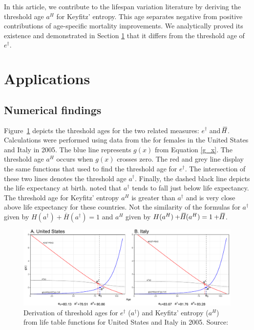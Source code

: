 \documentclass[a4paper,twoside, openright, 12pt, leqno]{article}
\newcommand*\xbar[1]{%
   \hbox{%
     \vbox{%
       \hrule height 0.5pt %
       \kern0.3ex%
       \hbox{%
         \kern-0.25em%
         \ensuremath{#1}%
         \kern-0.05em%
       }%
     }%
   }%
}
\begin{document}
 In this article, we contribute to the lifespan variation literature by deriving the threshold age $a^H$ for Keyfitz' entropy. This age separates negative from positive contributions of age-specific mortality improvements. We analytically proved its existence and demonstrated in Section \ref{sec:application} that it differs from the threshold age of $e^\dagger$.


\section{Applications}
\label{sec:application}

\subsection{Numerical findings}

Figure~\ref{fig:Fig1} depicts the threshold ages for the two related measures: $e^\dagger$ and $\xbar{H}$. Calculations were performed using data from the \citet{HMD} for females in the United States and Italy in 2005. The blue line represents $g(x)$ from Equation \eqref{g_x}. The threshold age $a^H$ occurs when  $g(x)$ crosses zero. The red and grey line display the same functions that \cite{Zhang2009} used to find the threshold age for $e^\dagger$. The intersection of these two lines denotes the threshold age $a^\dagger$. Finally, the dashed black line depicts the life expectancy at birth. \citet{Vaupel2011} noted that $a^\dagger$ tends to fall just below life expectancy. The threshold age for Keyfitz' entropy $a^H$ is greater than $a^\dagger$ and is very close above life expectancy for these countries. Not the similarity of the formulas for $a^\dagger$ given by $H(a^\dagger)+ \bar{H}(a^\dagger)=1$ and $a^H$ given by $H(a^H)+ \xbar{H}(a^H)= 1+\xbar{H}$.

\begin{figure}[h]
  \centering
  \includegraphics[scale=.72]{Figures/Ages2005}
  \caption{Derivation of threshold ages for $e^\dagger$ ($a^\dagger$) and Keyfitz' entropy ($a^H$) from life table functions for United States and Italy in 2005. Source: \cite{HMD}}
  \label{fig:Fig1}
\end{figure}
\end{document}

